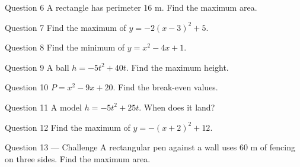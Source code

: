 \documentclass[11pt]{article}
\begin{document}
\begin{qbox}{Question 6}
A rectangle has perimeter 16 m. Find the maximum area.\workspace{2.4cm}
\end{qbox}

\begin{qbox}{Question 7}
Find the maximum of $y=-2(x-3)^2+5$.\workspace{2.4cm}
\end{qbox}

\begin{qbox}{Question 8}
Find the minimum of $y=x^2-4x+1$.\workspace{2.4cm}
\end{qbox}

\begin{qbox}{Question 9}
A ball $h=-5t^2+40t$. Find the maximum height.\workspace{2.4cm}
\end{qbox}

\begin{qbox}{Question 10}
$P=x^2-9x+20$. Find the break-even values.\workspace{2.4cm}
\end{qbox}

\begin{qbox}{Question 11}
A model $h=-5t^2+25t$. When does it land?\workspace{2.4cm}
\end{qbox}

\begin{qbox}{Question 12}
Find the maximum of $y=-(x+2)^2+12$.\workspace{2.4cm}
\end{qbox}

\begin{qbox}{Question 13 --- Challenge}
A rectangular pen against a wall uses 60 m of fencing on three sides. Find the maximum area.\workspace{3.5cm}
\end{qbox}

\clearpage
{}
\end{document}
